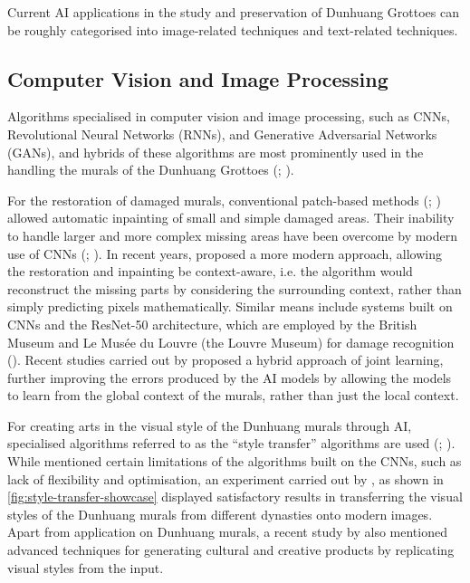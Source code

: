 Current AI applications in the study and preservation of Dunhuang Grottoes can be roughly categorised into
image-related techniques and text-related techniques.

\subsection{Computer Vision and Image Processing}
\label{sec:computer-vision-image-processing}

Algorithms specialised in computer vision and image processing, such as CNNs, Revolutional Neural Networks
(RNNs), and Generative Adversarial Networks (GANs), and hybrids of these algorithms are most prominently
used in the handling the murals of the Dunhuang Grottoes (;
).

For the restoration of damaged murals, conventional patch-based methods
(; )
allowed automatic inpainting of small and simple damaged areas. Their inability to handle larger and more complex
missing areas have been overcome by modern use of CNNs (;
).
In recent years,  proposed a more modern approach,
allowing the restoration and inpainting be context-aware, i.e. the algorithm would reconstruct the missing parts
by considering the surrounding context, rather than simply predicting pixels mathematically.
Similar means include systems built on CNNs and the ResNet-50 architecture, which are employed by the British
Museum and Le Musée du Louvre (the Louvre Museum) for damage recognition
().
Recent studies carried out by  proposed a hybrid approach of joint
learning, further improving the errors produced by the AI models by allowing the models to learn from the global
context of the murals, rather than just the local context.

For creating arts in the visual style of the Dunhuang murals through AI, specialised algorithms referred to as
the ``style transfer'' algorithms are used (;
). While  mentioned certain limitations of the
algorithms built on the CNNs, such as lack of flexibility and optimisation, an experiment carried out by 
, as shown in \cref{fig:style-transfer-showcase}
displayed satisfactory results in transferring
the visual styles of the Dunhuang murals from different dynasties onto modern images.
Apart from application on Dunhuang murals,
a recent study by  also mentioned advanced techniques for generating
cultural and creative products by replicating visual styles from the input.

